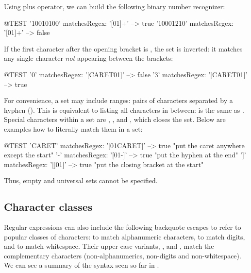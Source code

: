 \documentclass[a4paper,10pt,twoside]{book}
\begin{document}
{Using plus operator, we can build the following binary number recognizer:
\begin{code}{@TEST}
'10010100' matchesRegex: '[01]+' --> true
'10001210' matchesRegex: '[01]+' --> false
\end{code}

If the first character after the opening bracket is , the set is inverted: it matches any single character \emph{not} appearing between the brackets:
\begin{code}{@TEST}
'0' matchesRegex: '[CARET01]' --> false
'3' matchesRegex: '[CARET01]' --> true
\end{code}

For convenience, a set may include ranges: pairs of characters separated by a hyphen (\ct{-}). This is equivalent to listing all characters in between:  is the same as .
Special characters within a set are , \ct{-}, and \ct{]}, which closes the set. Below are examples how to literally match them in a set:
\begin{code}{@TEST}
'CARET' matchesRegex: '[01CARET]'   --> true    "put the caret anywhere except the start"
'-' matchesRegex: '[01-]' --> true    "put the hyphen at the end"
']' matchesRegex: '[]01]'   --> true    "put the closing bracket at the start"
\end{code}

Thus, empty and universal sets cannot be specified.

\subsection{Character classes}
Regular expressions can also include the following backquote escapes to refer to popular classes of characters: \ct{\w} to match alphanumeric characters, \ct{\d} to match digits, and \ct{\s} to match whitespace.
Their upper-case variants, \ct{\W}, \ct{\D} and \ct{\S}, match the complementary characters (non-alphanumerics, non-digits and non-whitespace).
We can see a summary of the syntax seen so far in .

}
\end{document}
